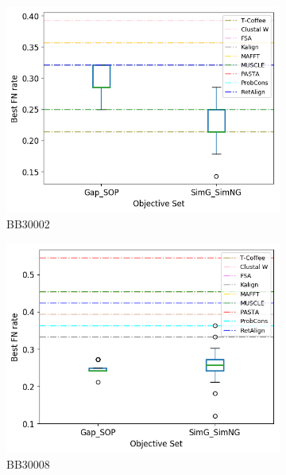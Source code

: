 \begin{figure}[!htbp]
\begin{adjustwidth}{-1cm}{-1cm}
\begin{subfigure}{0.22\textwidth}
			\includegraphics[width=\columnwidth]{Figure/summary/precomputedInit/Balibase/BB30002_objset_fnrate_rank}
			\caption{BB30002}
		\end{subfigure}
		\begin{subfigure}{0.22\textwidth}
			\includegraphics[width=\columnwidth]{Figure/summary/precomputedInit/Balibase/BB30008_objset_fnrate_rank}
			\caption{BB30008}
		\end{subfigure}		
		\begin{subfigure}{0.22\textwidth}

\end{subfigure}
\end{adjustwidth}
\end{figure}
